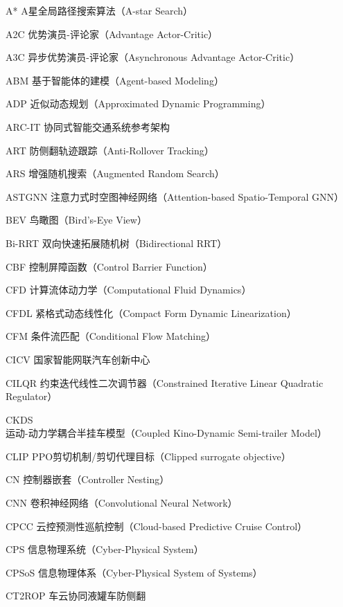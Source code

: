 
\begin{denotation}[3cm]
  \item[A*] A星全局路径搜索算法（A-star Search）
  \item[A2C] 优势演员-评论家（Advantage Actor-Critic）
  \item[A3C] 异步优势演员-评论家（Asynchronous Advantage Actor-Critic）
  \item[ABM] 基于智能体的建模（Agent-based Modeling）
  \item[ADP] 近似动态规划（Approximated Dynamic Programming）
  \item[ARC-IT] 协同式智能交通系统参考架构
  \item[ART] 防侧翻轨迹跟踪（Anti-Rollover Tracking）
  \item[ARS] 增强随机搜索（Augmented Random Search）
  \item[ASTGNN] 注意力式时空图神经网络（Attention-based Spatio-Temporal GNN）
  \item[BEV] 鸟瞰图（Bird's-Eye View）
  \item[Bi-RRT] 双向快速拓展随机树（Bidirectional RRT）
  \item[CBF] 控制屏障函数（Control Barrier Function）
  \item[CFD] 计算流体动力学（Computational Fluid Dynamics）
  \item[CFDL] 紧格式动态线性化（Compact Form Dynamic Linearization）
  \item[CFM] 条件流匹配（Conditional Flow Matching）
  \item[CICV] 国家智能网联汽车创新中心
  \item[CILQR] 约束迭代线性二次调节器（Constrained Iterative Linear Quadratic Regulator）
  \item[CKDS] 运动-动力学耦合半挂车模型（Coupled Kino-Dynamic Semi-trailer Model）
  \item[CLIP] PPO剪切机制/剪切代理目标（Clipped surrogate objective）
  \item[CN] 控制器嵌套（Controller Nesting）
  \item[CNN] 卷积神经网络（Convolutional Neural Network）
  \item[CPCC] 云控预测性巡航控制（Cloud-based Predictive Cruise Control）
  \item[CPS] 信息物理系统（Cyber-Physical System）
  \item[CPSoS] 信息物理体系（Cyber-Physical System of Systems）
  \item[CT2ROP] 车云协同液罐车防侧翻

\end{denotation}
